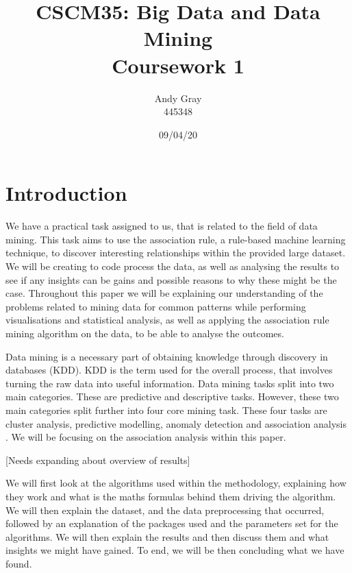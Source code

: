 \documentclass[a4paper,10pt]{article}
\begin{document}
\title{\textbf{CSCM35: Big Data and Data Mining \\Coursework 1}}
\date{09/04/20}
\author{Andy Gray\\445348}

\maketitle

\section{Introduction}

We have a practical task assigned to us, that is related to the field of data mining. This task aims to use the association rule, a rule-based machine learning technique, to discover interesting relationships within the provided large dataset. We will be creating to code process the data, as well as analysing the results to see if any insights can be gains and possible reasons to why these might be the case. Throughout this paper we will be explaining our understanding of the problems related to mining data for common patterns while performing visualisations and statistical analysis, as well as applying the association rule mining algorithm on the data, to be able to analyse the outcomes.

Data mining is a necessary part of obtaining knowledge through discovery in databases (KDD). KDD is the term used for the overall process, that involves turning the raw data into useful information. Data mining tasks split into two main categories. These are predictive and descriptive tasks. However, these two main categories split further into four core mining task. These four tasks are cluster analysis, predictive modelling, anomaly detection and association analysis \cite{tan2016introduction}. We will be focusing on the association analysis within this paper.

[Needs expanding about overview of results]

We will first look at the algorithms used within the methodology, explaining how they work and what is the maths formulas behind them driving the algorithm. We will then explain the dataset, and the data preprocessing that occurred, followed by an explanation of the packages used and the parameters set for the algorithms. We will then explain the results and then discuss them and what insights we might have gained. To end, we will be then concluding what we have found.
\end{document}
